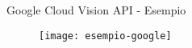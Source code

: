%
\begin{frame}[t]{Google Cloud Vision API - Esempio}
	\begin{figure}[h]
	\centering
	    \texttt{[image: esempio-google]}
		\label{fig:esempio-google}
	\end{figure}
\end{frame}
%
